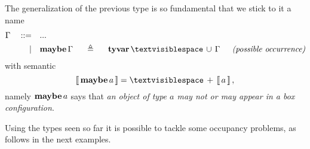 \begin{definition}[\tymaybe{\gamma}]
The generalization of the previous type is so fundamental that we stick to it a name
\begin{displaymath}
\begin{split}
    \Gamma\quad::=\quad&... \\
           |\quad&\tydef{\tymaybe{\Gamma}}{\tydu{\tyvar{␣}}{\Gamma}}{possible occurrence}
\end{split}
\end{displaymath}
with semantic
\begin{displaymath}
    \semantic{\tymaybe{a}} = ␣\,+\,\semantic{a},
\end{displaymath}
namely $\textbf{maybe}\,a$ says that \textit{an object of type $a$
may not or may appear in a box configuration}.
\end{definition}

Using the types seen so far it is possible to tackle some occupancy problems,
as follows in the next examples.

